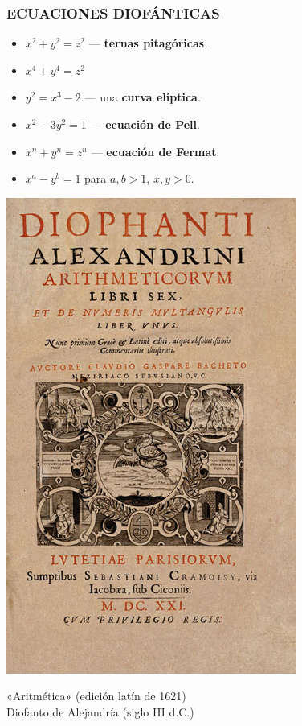 \begin{frame}
  \frametitle{ECUACIONES DIOFÁNTICAS}


    \begin{itemize}
    \item<3-> $x^2 + y^2 = z^2$ --- \textbf{ternas pitagóricas}.


    \item<5-> $x^4 + y^4 = z^2$

    \item<7-> $y^2 = x^3 - 2$ --- una \textbf{curva elíptica}.

    \item<9-> $x^2 - 3 y^2 = 1$ --- \textbf{ecuación de Pell}.


    \item<11-> $x^n + y^n = z^n$ --- \textbf{ecuación de Fermat}.


    \item<13-> $x^a - y^b = 1$ para $a,b > 1$, $x,y > 0$.

    \end{itemize}
\end{frame}

\begin{frame}
  \begin{center}
    \includegraphics[width=.4\textwidth]{pic/diofanto-aritmetica.jpg}

    «Aritmética» (edición latín de 1621) \\
    Diofanto de Alejandría (siglo III d.C.)
  \end{center}
\end{frame}


